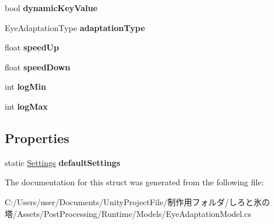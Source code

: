 \begin{DoxyCompactItemize}
bool {\bfseries dynamic\+Key\+Value}
\item 
\mbox{\label{struct_unity_engine_1_1_post_processing_1_1_eye_adaptation_model_1_1_settings_a9dc6f8242b612ecfeaf1bb854e49a9f3}} 
Eye\+Adaptation\+Type {\bfseries adaptation\+Type}
\item 
\mbox{\label{struct_unity_engine_1_1_post_processing_1_1_eye_adaptation_model_1_1_settings_a16ecb91ebe339a0b0775a67a4eb04c61}} 
float {\bfseries speed\+Up}
\item 
\mbox{\label{struct_unity_engine_1_1_post_processing_1_1_eye_adaptation_model_1_1_settings_acf5028b7150072c3b3907e9b7cf0a878}} 
float {\bfseries speed\+Down}
\item 
\mbox{\label{struct_unity_engine_1_1_post_processing_1_1_eye_adaptation_model_1_1_settings_a9320d074e46d0714a75171f40e1c554d}} 
int {\bfseries log\+Min}
\item 
\mbox{\label{struct_unity_engine_1_1_post_processing_1_1_eye_adaptation_model_1_1_settings_ab1e84b7f5403c844e026677ce5e1c6ea}} 
int {\bfseries log\+Max}
\end{DoxyCompactItemize}
\subsection*{Properties}
\begin{DoxyCompactItemize}
\item 
\mbox{\label{struct_unity_engine_1_1_post_processing_1_1_eye_adaptation_model_1_1_settings_af84171d648e86938b92e10bf39a35ad1}} 
static \hyperlink{struct_unity_engine_1_1_post_processing_1_1_eye_adaptation_model_1_1_settings}{Settings} {\bfseries default\+Settings}
\end{DoxyCompactItemize}


The documentation for this struct was generated from the following file\+:\begin{DoxyCompactItemize}
\item 
C\+:/\+Users/user/\+Documents/\+Unity\+Project\+File/制作用フォルダ/しろと氷の塔/\+Assets/\+Post\+Processing/\+Runtime/\+Models/Eye\+Adaptation\+Model.\+cs\end{DoxyCompactItemize}
